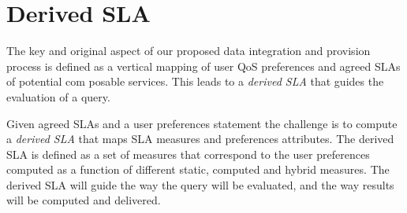  
\section{Derived SLA}
\label{sec:slaModel}

The key and original aspect of  our proposed data integration and provision process is  defined as a vertical mapping of user QoS preferences and agreed SLAs of potential com posable services. This  leads to a {\em derived SLA} that guides the evaluation of a query. 





Given agreed SLAs and a user preferences statement the challenge is to compute a  {\em derived SLA} that  maps SLA measures and preferences attributes.  
The derived SLA is defined as a set of measures that correspond to the user preferences computed as a function of different static, computed and hybrid measures. 
The derived SLA  will guide the way the query will be evaluated, and the way results will be computed and delivered.

